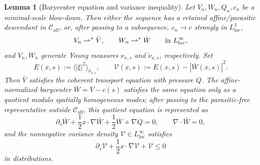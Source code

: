 \documentclass[11pt]{amsart}
\numberwithin{equation}{section}
\theoremstyle{plain}
\newtheorem{lemma}[theorem]{Lemma}
\theoremstyle{definition}
\theoremstyle{remark}
\newcommand{\loc}{\mathrm{loc}}
\newcommand{\Caff}{\mathcal C_{\mathrm{aff}}}
\begin{document}
\begin{lemma}[Barycenter equation and variance inequality]
\label{lem:first-bad-young-variance}
Let \(V_n,W_n,Q_n,c_n\) be a minimal-scale blow-down.  Then either the sequence has
a retained affine/parasitic descendant in \(\Caff\), or, after passing to a
subsequence, \(c_n\to c\) strongly in \(L^3_{\loc}\),
\[
   V_n\rightharpoonup^\ast \bar V,\qquad
   W_n\rightharpoonup^\ast \bar W
   \qquad\hbox{in }L^\infty_{\loc},
\]
and \(V_n,W_n\) generate Young measures \(\nu_{x,s}\) and
\(\widetilde\nu_{x,s}\), respectively.  Set
\[
   E(x,s):=\langle |\xi|^2\rangle_{\widetilde\nu_{x,s}},
   \qquad
   \mathcal V(x,s):=E(x,s)-|\bar W(x,s)|^2 .
\]
Then \(\bar V\) satisfies the coherent transport equation with pressure \(Q\).
The affine-normalized barycenter \(\bar W=\bar V-c(s)\) satisfies the same
equation only as a quotient modulo spatially homogeneous modes; after passing
to the parasitic-free representative outside \(\Caff\), this quotient equation
is represented as
\begin{equation}\label{eq:first-bad-barycenter-equation}
   \partial_s\bar W+\frac12x\cdot\nabla\bar W+\frac12\bar W+\nabla Q=0,
   \qquad \nabla\cdot\bar W=0,
\end{equation}
and the nonnegative variance density \(\mathcal V\in L^\infty_{\loc}\)
satisfies
\begin{equation}\label{eq:first-bad-variance-ineq}
   \partial_s\mathcal V+\frac12x\cdot\nabla\mathcal V+\mathcal V\le0
\end{equation}
in distributions.
\end{lemma}
\end{document}
